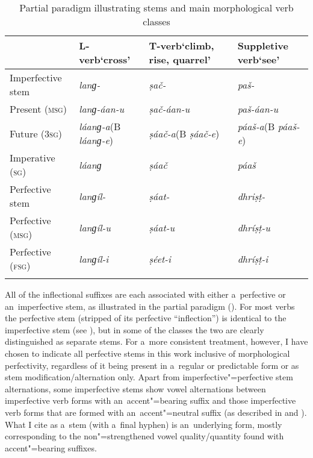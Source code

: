 \begin{table}[ht]
\caption{Partial paradigm illustrating stems and main morphological verb classes}

\begin{tabularx}{\textwidth}{ l P{20mm} Q P{27mm} }
\lsptoprule
& L-verb\newline `cross' &
T-verb\newline `climb, rise, quarrel' &
Suppletive verb\newline `see'\\\midrule
Imperfective stem &
\textit{lanɡ-} &
\textit{ṣač-} &
\textit{paš-} \\
Present (\textsc{msg}) &
\textit{lanɡ-áan-u} &
\textit{ṣač-áan-u} &
\textit{paš-áan-u} \\
Future (\textsc{3sg}) &
\textit{láanɡ-a}\newline (B \textit{láanɡ-e}) &
\textit{ṣáač-a}\newline (B \textit{ṣáač-e}) &
\textit{páaš-a}\newline (B \textit{páaš-e}) \\
Imperative (\textsc{sg}) &
\textit{láanɡ} &
\textit{ṣáač} &
\textit{páaš} \\
Perfective stem &
\textit{lanɡíl-} &
\textit{ṣáat-} &
\textit{dhriṣṭ-} \\
Perfective (\textsc{msg}) &
\textit{lanɡíl-u} &
\textit{ṣáat-u} &
\textit{dhríṣṭ-u} \\
Perfective (\textsc{fsg}) &
\textit{lanɡíl-i} &
\textit{ṣéet-i} &
\textit{dhríṣṭ-i} \\\lspbottomrule
\end{tabularx}
\label{tab:8-3}
\end{table}


All of the inflectional suffixes are each associated with either a~perfective or an~imperfective
stem, as illustrated in the partial paradigm (). For most verbs the perfective stem
(stripped of its perfective ``inflection'') is identical to the imperfective stem (see ), but
in some of the classes the two are clearly distinguished as separate stems. For a~more consistent
treatment, however, I have chosen to indicate all perfective stems in this work inclusive of
morphological perfectivity, regardless of it being present in a~regular or predictable form or as
stem modification/alternation only. Apart from imperfective"=perfective stem alternations, some
imperfective stems show vowel alternations between imperfective verb forms with an~accent"=bearing
suffix and those imperfective verb forms that are formed with an~accent"=neutral suffix (as described
in  and ). What I cite as a~stem (with a~final hyphen) is an~underlying form, mostly
corresponding to the non"=strengthened vowel quality/quantity found with accent"=bearing suffixes.


